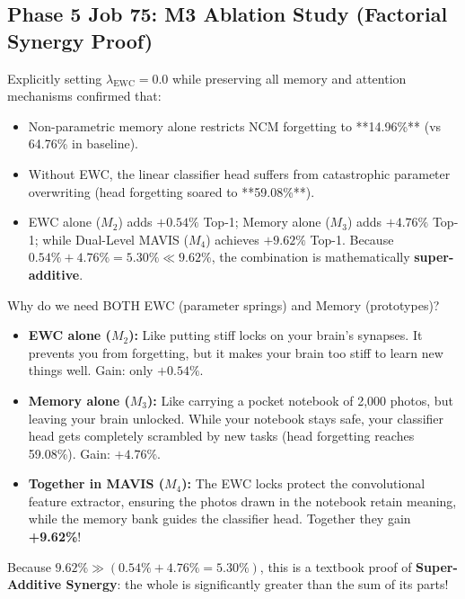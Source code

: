 \documentclass[11pt,a4paper]{article}
\begin{document}
\subsection{Phase 5 Job 75: M3 Ablation Study (Factorial Synergy Proof)}
Explicitly setting $\lambda_{\text{EWC}} = 0.0$ while preserving all memory and attention mechanisms confirmed that:
\begin{itemize}[noitemsep]
    \item Non-parametric memory alone restricts NCM forgetting to **14.96\%** (vs 64.76\% in baseline).
    \item Without EWC, the linear classifier head suffers from catastrophic parameter overwriting (head forgetting soared to **59.08\%**).
    \item EWC alone ($M_2$) adds $+0.54\%$ Top-1; Memory alone ($M_3$) adds $+4.76\%$ Top-1; while Dual-Level MAVIS ($M_4$) achieves $+9.62\%$ Top-1. Because $0.54\% + 4.76\% = 5.30\% \ll 9.62\%$, the combination is mathematically \textbf{super-additive}.
\end{itemize}

\begin{callout}[Student Perspective: Why Parameter Locks + Memory Bank = Super-Additive ($1 + 1 = 5$)]
Why do we need BOTH EWC (parameter springs) and Memory (prototypes)?
\begin{itemize}[noitemsep]
    \item \textbf{EWC alone ($M_2$):} Like putting stiff locks on your brain's synapses. It prevents you from forgetting, but it makes your brain too stiff to learn new things well. Gain: only $+0.54\%$.
    \item \textbf{Memory alone ($M_3$):} Like carrying a pocket notebook of 2,000 photos, but leaving your brain unlocked. While your notebook stays safe, your classifier head gets completely scrambled by new tasks (head forgetting reaches 59.08\%). Gain: $+4.76\%$.
    \item \textbf{Together in MAVIS ($M_4$):} The EWC locks protect the convolutional feature extractor, ensuring the photos drawn in the notebook retain meaning, while the memory bank guides the classifier head. Together they gain \textbf{+9.62\%}!
\end{itemize}
Because $9.62\% \gg (0.54\% + 4.76\% = 5.30\%)$, this is a textbook proof of \textbf{Super-Additive Synergy}: the whole is significantly greater than the sum of its parts!
\end{callout}

\newpage
\end{document}
